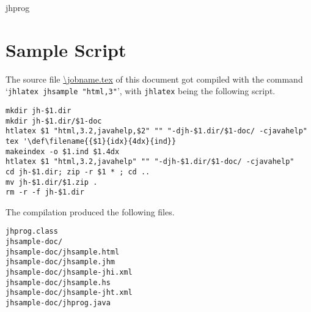 \documentclass{article}
\begin{document}
\OutputCode\<jhprog\>


\section{Sample Script}

The source file \edef\temp{\noexpand\url{\jobname.tex}}\temp{} of this
document got compiled with the command `{\tt jhlatex jhsample "html,3"}', with
{\tt jhlatex} being the following script.

\begin{verbatim}
mkdir jh-$1.dir
mkdir jh-$1.dir/$1-doc
htlatex $1 "html,3.2,javahelp,$2" "" "-djh-$1.dir/$1-doc/ -cjavahelp"
tex '\def\filename{{$1}{idx}{4dx}{ind}} 
makeindex -o $1.ind $1.4dx
htlatex $1 "html,3.2,javahelp" "" "-djh-$1.dir/$1-doc/ -cjavahelp"
cd jh-$1.dir; zip -r $1 * ; cd ..
mv jh-$1.dir/$1.zip .
rm -r -f jh-$1.dir
\end{verbatim}

The compilation produced the following files.

\begin{verbatim}
jhprog.class
jhsample-doc/
jhsample-doc/jhsample.html
jhsample-doc/jhsample.jhm
jhsample-doc/jhsample-jhi.xml
jhsample-doc/jhsample.hs
jhsample-doc/jhsample-jht.xml
jhsample-doc/jhprog.java
\end{verbatim}

\printindex
\end{document}
